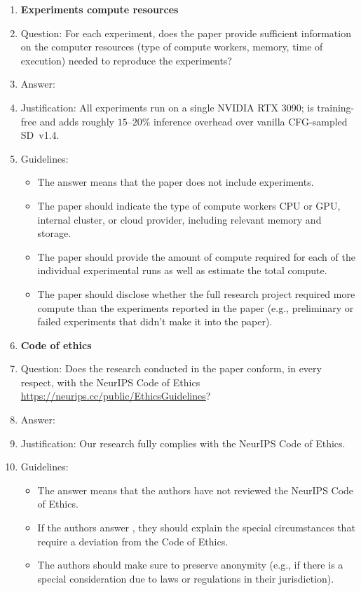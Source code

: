 \begin{enumerate}
\item {\bf Experiments compute resources}
    \item[] Question: For each experiment, does the paper provide sufficient information on the computer resources (type of compute workers, memory, time of execution) needed to reproduce the experiments?
    \item[] Answer: \answerYes{}
    \item[] Justification: All experiments run on a single NVIDIA RTX 3090; \ours{} is training-free and adds roughly $15$--$20\%$ inference overhead over vanilla CFG-sampled SD~v1.4.
    \item[] Guidelines:
    \begin{itemize}
        \item The answer \answerNA{} means that the paper does not include experiments.
        \item The paper should indicate the type of compute workers CPU or GPU, internal cluster, or cloud provider, including relevant memory and storage.
        \item The paper should provide the amount of compute required for each of the individual experimental runs as well as estimate the total compute.
        \item The paper should disclose whether the full research project required more compute than the experiments reported in the paper (e.g., preliminary or failed experiments that didn't make it into the paper).
    \end{itemize}

\item {\bf Code of ethics}
    \item[] Question: Does the research conducted in the paper conform, in every respect, with the NeurIPS Code of Ethics \url{https://neurips.cc/public/EthicsGuidelines}?
    \item[] Answer: \answerYes{}
    \item[] Justification: Our research fully complies with the NeurIPS Code of Ethics.
    \item[] Guidelines:
    \begin{itemize}
        \item The answer \answerNA{} means that the authors have not reviewed the NeurIPS Code of Ethics.
        \item If the authors answer \answerNo, they should explain the special circumstances that require a deviation from the Code of Ethics.
        \item The authors should make sure to preserve anonymity (e.g., if there is a special consideration due to laws or regulations in their jurisdiction).
    \end{itemize}



\end{enumerate}

